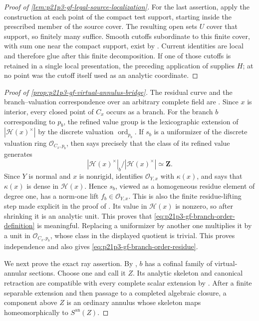 \begin{proof}[Proof of
\cref{lem:p21p3-gf-legal-source-localization}]
For the last assertion, apply the construction at each point of the compact
test support, starting inside the prescribed member of the source cover.
The resulting open sets \(U\) cover that support, so finitely many suffice.
Smooth cutoffs subordinate to this finite cover, with sum one near the
compact support, exist by \cite[Corollary~15.2.9]{CLD25}.  Current identities
are local and therefore glue after this finite decomposition.  If one of
those cutoffs is retained in a
single local presentation, the preceding application of
\cite[Corollary~15.1.2]{CLD25} supplies \(H\); at no point was the cutoff
itself used as an analytic coordinate.
\end{proof}

\begin{proof}[Proof of
\cref{prop:p21p3-gf-virtual-annulus-bridge}]
The residual curve and the branch--valuation correspondence over an
arbitrary complete field are
\cite[\S\S3.3.5.2, 4.2.6, 4.2.9, and 4.2.11.1]
{Ducros24CurveStructure}.  Since \(x\)
is interior, every closed point of \(C_x\) occurs as a branch.  For the branch
\(b\) corresponding to \(p_b\), the refined value group is the lexicographic
extension of \(|\mathcal H(x)^{\times}|\) by the discrete valuation
\(\operatorname{ord}_{p_b}\).  If \(s_b\) is a uniformizer of the discrete
valuation ring \(\mathcal O_{C_x,p_b}\), then
\cite[\S4.2.11.1]{Ducros24CurveStructure} says precisely that the class of
its refined value generates
\[
 |\mathcal H(x)^{\times}|_b/|\mathcal H(x)^{\times}|\simeq\mathbf Z.
\]
Since \(Y\) is normal and \(x\) is nonrigid,
\cite[\S4.2.18]{Ducros24CurveStructure} identifies
\(\mathcal O_{Y,x}\) with \(\kappa(x)\), and
\cite[\S4.2.6]{Ducros24CurveStructure} says that \(\kappa(x)\) is dense in
\(\mathcal H(x)\).  Hence \(s_b\), viewed as a homogeneous residue element
of degree one, has a norm-one lift \(f_b\in\mathcal O_{Y,x}\).  This is also
the finite residue-lifting step made explicit in the proof of
\cite[Lemma~6.14]{GJR26}.  Its value in \(\mathcal H(x)\) is nonzero, so
after shrinking it is an analytic unit.  This proves that
\eqref{eq:p21p3-gf-branch-order-definition} is meaningful.  Replacing a
uniformizer by another one multiplies it by a unit in
\(\mathcal O_{C_x,p_b}\), whose class in the displayed quotient is trivial.
This proves independence and also gives
\eqref{eq:p21p3-gf-branch-order-residue}.

We next prove the exact ray assertion.  By
\cite[Proposition~4.3.9(2) and \S\S4.3.10.2--4.3.10.3]
{Ducros24CurveStructure}, \(b\) has a cofinal family of virtual-annular
sections.  Choose one and call it \(Z\).  Its analytic skeleton and canonical
retraction are compatible with every complete scalar extension by
\cite[\S\S3.6.35.5--3.6.35.10]{Ducros24CurveStructure}.  After a finite
separable extension and then passage to a completed algebraic closure, a
component above \(Z\) is an ordinary annulus whose skeleton maps
homeomorphically to \(S^{\mathrm{an}}(Z)\).


\end{proof}
